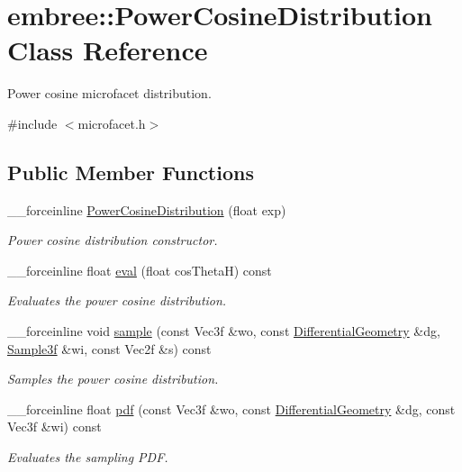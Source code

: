 \hypertarget{classembree_1_1_power_cosine_distribution}{
\section{embree::PowerCosineDistribution Class Reference}
\label{classembree_1_1_power_cosine_distribution}
}


Power cosine microfacet distribution.  




{\ttfamily \#include $<$microfacet.h$>$}

\subsection*{Public Member Functions}
\begin{DoxyCompactItemize}
\item 
\_\-\_\-forceinline \hyperlink{classembree_1_1_power_cosine_distribution_a6e3029a1ec75c5bc422ef304083e9711}{PowerCosineDistribution} (float exp)
\begin{DoxyCompactList}\small\item\em Power cosine distribution constructor. \item\end{DoxyCompactList}\item 
\_\-\_\-forceinline float \hyperlink{classembree_1_1_power_cosine_distribution_ad69972d57636a4d46e33620c9b828ab2}{eval} (float cosThetaH) const 
\begin{DoxyCompactList}\small\item\em Evaluates the power cosine distribution. \item\end{DoxyCompactList}\item 
\_\-\_\-forceinline void \hyperlink{classembree_1_1_power_cosine_distribution_a9080b577ebc121301896436ace03cd6a}{sample} (const Vec3f \&wo, const \hyperlink{structembree_1_1_differential_geometry}{DifferentialGeometry} \&dg, \hyperlink{structembree_1_1_sample}{Sample3f} \&wi, const Vec2f \&s) const 
\begin{DoxyCompactList}\small\item\em Samples the power cosine distribution. \item\end{DoxyCompactList}\item 
\_\-\_\-forceinline float \hyperlink{classembree_1_1_power_cosine_distribution_ade8a928d574cc15b2f90bfc604884684}{pdf} (const Vec3f \&wo, const \hyperlink{structembree_1_1_differential_geometry}{DifferentialGeometry} \&dg, const Vec3f \&wi) const 
\begin{DoxyCompactList}\small\item\em Evaluates the sampling PDF. \item\end{DoxyCompactList}\end{DoxyCompactItemize}


